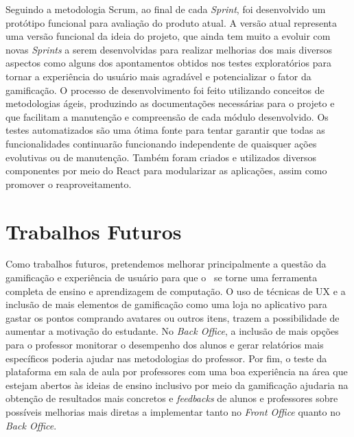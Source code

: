 Seguindo a metodologia Scrum, ao final de cada \textit{Sprint}, foi desenvolvido um protótipo funcional para avaliação do produto atual. A versão atual representa uma versão funcional da ideia do projeto, que ainda tem muito a evoluir com novas \textit{Sprints} a serem desenvolvidas para realizar melhorias dos mais diversos aspectos como alguns dos apontamentos obtidos nos testes exploratórios para tornar a experiência do usuário mais agradável e potencializar o fator da gamificação. O processo de desenvolvimento foi feito utilizando conceitos de metodologias ágeis, produzindo as documentações necessárias para o projeto e que facilitam a manutenção e compreensão de cada módulo desenvolvido. Os testes automatizados \cite{tdd} são uma ótima fonte para tentar garantir que todas as funcionalidades continuarão funcionando independente de quaisquer ações evolutivas ou de manutenção. Também foram criados e utilizados diversos componentes por meio do React para modularizar as aplicações, assim como promover o reaproveitamento.

\section{Trabalhos Futuros}

Como trabalhos futuros, pretendemos melhorar principalmente a questão da gamificação e experiência de usuário para que o \appName\ se torne uma ferramenta completa de ensino e aprendizagem de computação. O uso de técnicas de UX \cite{ux} e a inclusão de mais elementos de gamificação \cite{gamification_motivates} como uma loja no aplicativo para gastar os pontos comprando avatares ou outros itens, trazem a possibilidade de aumentar a motivação do estudante. No \textit{Back Office}, a inclusão de mais opções para o professor monitorar o desempenho dos alunos e gerar relatórios mais específicos poderia ajudar nas metodologias do professor.
Por fim, o teste da plataforma em sala de aula por professores com uma boa experiência na área que estejam abertos às ideias de ensino inclusivo por meio da gamificação ajudaria na obtenção de resultados mais concretos e \textit{feedbacks} de alunos e professores sobre possíveis melhorias mais diretas a implementar tanto no \textit{Front Office} quanto no \textit{Back Office}.
